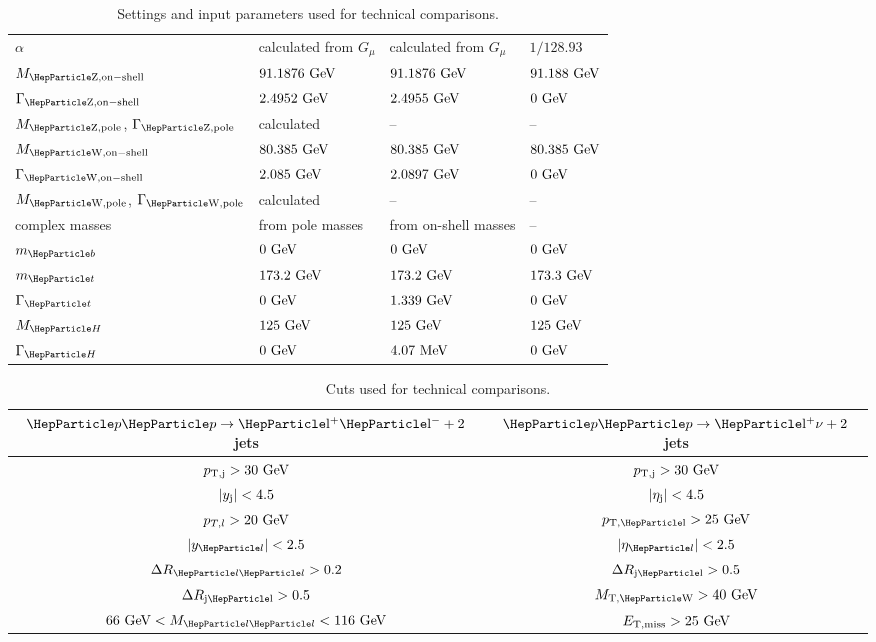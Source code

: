 \documentclass[11pt]{cernrep}
\begin{document}
\begin{table}
\begin{tabular}{l|p{9em}|p{9em}|p{9em}}
$\alpha$ &      calculated from $G_\mu$ & calculated from $G_\mu$ &
$1/128.93$ \\
$M_{\rm \PZ,on-shell}$         &$91.1876~\text{GeV}$ &  $91.1876~\text{GeV}$&    $91.188~\text{GeV}$ \\
$\Gamma_{\rm \PZ,on-shell}$   & $2.4952~\text{GeV}$&    $2.4955~\text{GeV}$&     $0~\text{GeV}$\\
$M_{\rm \PZ,pole}$, $\Gamma_{\rm \PZ,pole}$ &        calculated &    \qquad-- &     \qquad-- \\
$M_{\rm \PW,on-shell}$ & $80.385 ~\text{GeV}$ &    $80.385 ~\text{GeV}$ &    $80.385 ~\text{GeV}$ \\
$\Gamma_{\rm \PW,on-shell}$&         $2.085~\text{GeV}$ &     $2.0897~\text{GeV}$ &    $0~\text{GeV}$ \\
$M_{\rm \PW,pole}$, $\Gamma_{\rm \PW,pole}$ &       calculated &    \qquad-- &     \qquad-- \\
complex masses &  from pole masses & from on-shell masses  &        \qquad-- \\
$m_{\PQb}$ & $0~\text{GeV}$ & $0~\text{GeV}$ & $0~\text{GeV}$ \\
$m_{\PQt}$ & $173.2 ~\text{GeV}$ &     $173.2 ~\text{GeV}$ &    $ 173.3~\text{GeV}$ \\
$\Gamma_{\PQt}$ &  $0~\text{GeV}$ & $1.339~\text{GeV}$ & $0 ~\text{GeV}$ \\
$M_{\PH}$ & $125 ~\text{GeV}$ &       $125 ~\text{GeV}$ &        $125 ~\text{GeV}$ \\
$\Gamma_{\PH}$ &   $0~\text{GeV}$ & $4.07 ~\text{MeV}$ &      $0~\text{GeV}$\\
\end{tabular}
\caption{\label{tab:input;ew} Settings and input parameters used for technical comparisons.}
\end{table}

\begin{table}
\small
\centering
\tabcolsep 15pt
\begin{tabular}{c|c}
  $\Pp\Pp\to \mathrm{\Pl^+\Pl^-+2}$\,jets &
$\Pp\Pp\to \mathrm{\Pl^+\nu+2}$\,jets \\
\hline
   $p_{\rm T,j} > 30 ~\text{GeV}$  &   $p_{\rm T,j} > 30 ~\text{GeV}$      \\
       $|y_{\rm j}| < 4.5 $    & $|\eta_{\rm j}| < 4.5 $   \\
       $p_{T,l} > 20 ~\text{GeV}$    & $p_{\rm T,\Pl} > 25 \UGeV$      \\
       $|y_{\Pl}| < 2.5 $    & $|\eta_{\Pl}| < 2.5 $   \\
       $\Delta R_{\Pl\Pl} > 0.2 $& $\Delta R_{\rm j\Pl} > 0.5$   \\
       $\Delta R_{\rm j\Pl} > 0.5 $& $ M_{\rm T,\PW} > 40 \UGeV$     \\
       $ 66 \UGeV < M_{\Pl\Pl} < 116 \UGeV$&$ E_{\rm T,miss} > 25 ~\text{GeV}$\\   
\end{tabular}
\caption{\label{tab:cuts;ew} Cuts used for technical comparisons.}
\end{table}
\end{document}
